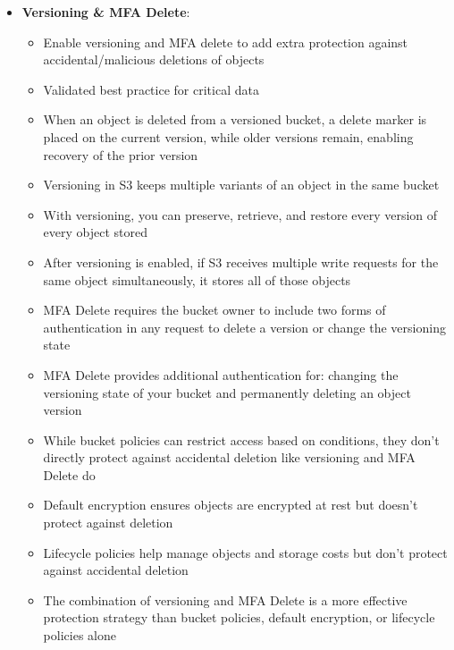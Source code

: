 \documentclass[11pt,a4paper]{report}
\begin{document}
\begin{itemize}
\begin{itemize}
  \item When combined with multipart uploads, is optimal for aggregating large data files (hundreds of GB) from global locations
  \item Superior to using Snowball Edge or EC2-based solutions for regular transfers of moderate data volumes (e.g., 500GB per site)
  \item Leverages CloudFront's edge network to route data more efficiently to S3
\end{itemize}
  \item \textbf{Versioning \& MFA Delete}:
\begin{itemize}
  \item Enable versioning and MFA delete to add extra protection against accidental/malicious deletions of objects
  \item Validated best practice for critical data
  \item When an object is deleted from a versioned bucket, a delete marker is placed on the current version, while older versions remain, enabling recovery of the prior version
  \item Versioning in S3 keeps multiple variants of an object in the same bucket
  \item With versioning, you can preserve, retrieve, and restore every version of every object stored
  \item After versioning is enabled, if S3 receives multiple write requests for the same object simultaneously, it stores all of those objects
  \item MFA Delete requires the bucket owner to include two forms of authentication in any request to delete a version or change the versioning state
  \item MFA Delete provides additional authentication for: changing the versioning state of your bucket and permanently deleting an object version
  \item While bucket policies can restrict access based on conditions, they don't directly protect against accidental deletion like versioning and MFA Delete do
  \item Default encryption ensures objects are encrypted at rest but doesn't protect against deletion
  \item Lifecycle policies help manage objects and storage costs but don't protect against accidental deletion
  \item The combination of versioning and MFA Delete is a more effective protection strategy than bucket policies, default encryption, or lifecycle policies alone

\end{itemize}
\end{itemize}
\end{document}
